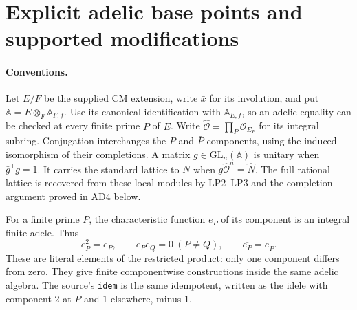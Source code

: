 \section{Explicit adelic base points and supported modifications}
\label{sec:adelic-geometry}


\paragraph{Conventions.}
Let $E/F$ be the supplied CM extension, write $\bar x$ for its
involution, and put $\mathbb A=E\otimes_F\mathbb A_{F,f}$.
Use its canonical identification with $\mathbb A_{E,f}$, so an
adelic equality can be checked at every finite prime $P$ of $E$.
Write $\widehat{\mathcal O}=\prod_P\mathcal O_{E_P}$ for its
integral subring. Conjugation interchanges the $P$ and $\bar P$
components, using the induced isomorphism of their completions.
A matrix $g\in\mathrm{GL}_n(\mathbb A)$ is unitary when
$\bar g^{\mathsf T}g=1$. It carries the standard lattice to $N$
when $g\widehat{\mathcal O}^{n}=\widehat N$.
The full rational lattice is recovered from these local modules
by LP2--LP3 and the completion argument proved in AD4 below.

For a finite prime $P$, the characteristic function $e_P$ of its
component is an integral finite adele. Thus
\[
 e_P^2=e_P,\qquad e_Pe_Q=0\ (P\ne Q),\qquad
 \overline{e_P}=e_{\bar P}.                         \tag{AD.1}
\]
These are literal elements of the restricted product: only one
component differs from zero. They give finite componentwise
constructions inside the same adelic algebra. The source's
\texttt{idem} is the same idempotent, written as the idele with
component $2$ at $P$ and $1$ elsewhere, minus $1$.

